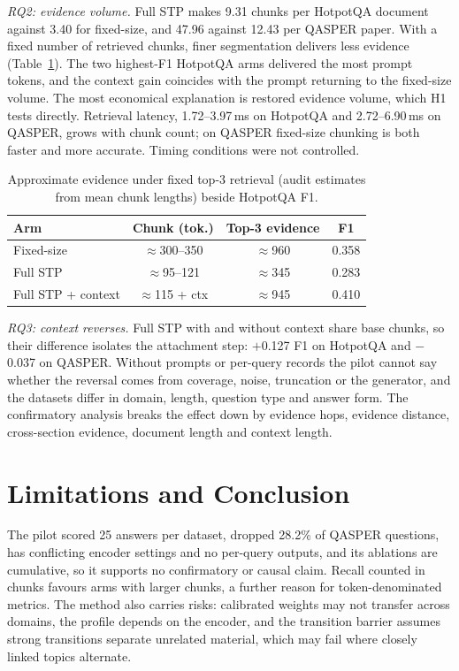 \documentclass[conference,a4paper]{IEEEtran}
\begin{document}
\textit{RQ2: evidence volume.} Full STP makes 9.31 chunks per HotpotQA document against 3.40 for fixed-size, and 47.96 against 12.43 per QASPER paper. With a fixed number of retrieved chunks, finer segmentation delivers less evidence (Table~\ref{tab:budget}). The two highest-F1 HotpotQA arms delivered the most prompt tokens, and the context gain coincides with the prompt returning to the fixed-size volume. The most economical explanation is restored evidence volume, which H1 tests directly. Retrieval latency, 1.72--3.97\,ms on HotpotQA and 2.72--6.90\,ms on QASPER, grows with chunk count; on QASPER fixed-size chunking is both faster and more accurate. Timing conditions were not controlled.

\begin{table}[t]
\caption{Approximate evidence under fixed top-3 retrieval (audit estimates from mean chunk lengths) beside HotpotQA F1.}
\label{tab:budget}
\centering\footnotesize
\setlength{\tabcolsep}{4pt}
\begin{tabular}{@{}lccc@{}}
\toprule
Arm & Chunk (tok.) & Top-3 evidence & F1 \\
\midrule
Fixed-size & $\approx$300--350 & $\approx$960 & 0.358 \\
Full STP & $\approx$95--121 & $\approx$345 & 0.283 \\
Full STP + context & $\approx$115 + ctx & $\approx$945 & 0.410 \\
\bottomrule
\end{tabular}
\end{table}

\textit{RQ3: context reverses.} Full STP with and without context share base chunks, so their difference isolates the attachment step: $+$0.127 F1 on HotpotQA and $-$0.037 on QASPER. Without prompts or per-query records the pilot cannot say whether the reversal comes from coverage, noise, truncation or the generator, and the datasets differ in domain, length, question type and answer form. The confirmatory analysis breaks the effect down by evidence hops, evidence distance, cross-section evidence, document length and context length.

\section{Limitations and Conclusion}
\label{sec:limitations}

The pilot scored 25 answers per dataset, dropped 28.2\% of QASPER questions, has conflicting encoder settings and no per-query outputs, and its ablations are cumulative, so it supports no confirmatory or causal claim. Recall counted in chunks favours arms with larger chunks, a further reason for token-denominated metrics. The method also carries risks: calibrated weights may not transfer across domains, the profile depends on the encoder, and the transition barrier assumes strong transitions separate unrelated material, which may fail where closely linked topics alternate.
\end{document}
